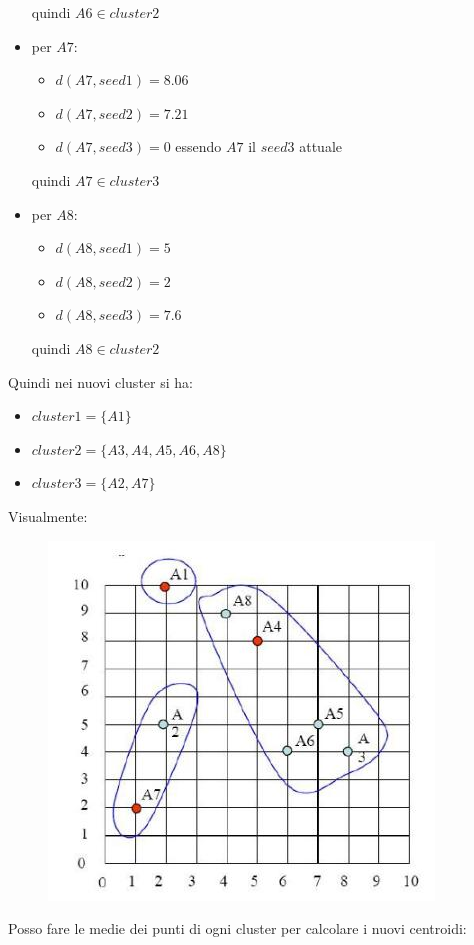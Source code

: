 \documentclass[a4paper,12pt, oneside]{book}
\begin{document}
\begin{esercizio}
\begin{itemize}
\begin{itemize}
    \end{itemize}
    quindi $A6\in cluster2$
    \item per $A7$:
    \begin{itemize}
      \item $d(A7,seed1)=8.06$ 
      \item $d(A7,seed2)=7.21$ 
      \item $d(A7,seed3)=0$ essendo $A7$ il $seed3$ attuale
    \end{itemize}
    quindi $A7\in cluster3$
    \item per $A8$:
    \begin{itemize}
      \item $d(A8,seed1)=5$ 
      \item $d(A8,seed2)=2$
      \item $d(A8,seed3)=7.6$
    \end{itemize}
    quindi $A8\in cluster2$
  \end{itemize}
  Quindi nei nuovi cluster si ha:
  \begin{itemize}
    \item $cluster1=\{A1\}$
    \item $cluster2=\{A3,A4,A5,A6,A8\}$
    \item $cluster3=\{A2, A7\}$
  \end{itemize}
  Visualmente:
  \begin{figure}[H]
    \centering
    \includegraphics[scale = 0.4]{img/clue2.jpg}
  \end{figure}
  Posso fare le medie dei punti di ogni cluster per calcolare i nuovi
  centroidi: 
  \begin{itemize}

\end{itemize}
\end{esercizio}
\end{document}
